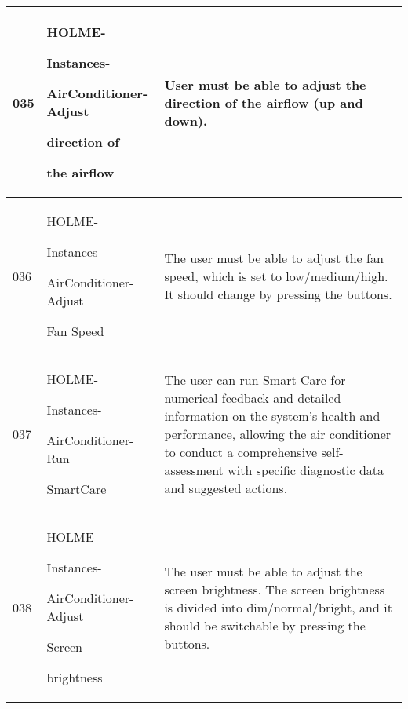 \documentclass[conference]{IEEEtran}
\begin{document}
\begin{enumerate}
\begin{itemize}
\begin{table}[h]
\begin{tabular}{|p{1cm}|p{1.8cm}|p{5.0cm}|}
         035 \par  & HOLME-\par Instances-\par AirConditioner-Adjust \par direction of \par the airflow & User must be able to adjust the direction of the airflow (up and down).\\ \hline
         036 \par  & HOLME-\par Instances-\par AirConditioner-Adjust \par Fan Speed & The user must be able to adjust the fan speed, which is set to low/medium/high. It should change by pressing the buttons.\\ \hline
         037 \par  & HOLME-\par Instances-\par AirConditioner-Run \par SmartCare & The user can run Smart Care for numerical feedback and detailed information on the system's health and performance, allowing the air conditioner to conduct a comprehensive self-assessment with specific diagnostic data and suggested actions.\\ \hline
         038 \par  & HOLME-\par Instances-\par AirConditioner-Adjust \par Screen \par brightness & The user must be able to adjust the screen brightness. The screen brightness is divided into dim/normal/bright, and it should be switchable by pressing the buttons.\\ \hline
    \end{tabular}
\end{table}

\vspace{1cm}


\end{itemize}
\end{enumerate}
\end{document}
